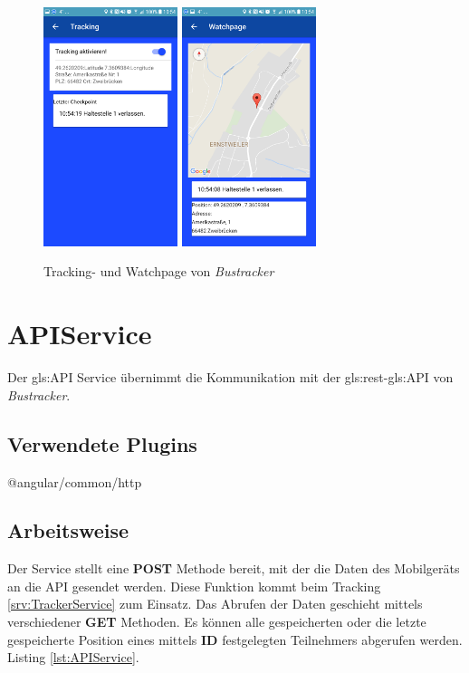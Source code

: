 \begin{figure}[htbp]
	\centering
	\includegraphics[width=0.35\textwidth]{images/Trackingpage.png}
	\includegraphics[width=0.35\textwidth]{images/Watchpage.png}
	\caption{Tracking- und Watchpage von \emph{Bustracker}}
\end{figure}

\pagebreak
\section{APIService}
\label{srv:APIService}
Der \gls{gls:API} Service übernimmt die Kommunikation mit der \gls{gls:rest}-\gls{gls:API} von \emph{Bustracker}. 
\subsection{Verwendete Plugins}
@angular/common/http \cite{AngularHttp}
\subsection{Arbeitsweise}
Der Service stellt eine \textbf{POST} Methode bereit, mit der die Daten des Mobilgeräts  an die API gesendet werden. Diese Funktion kommt beim Tracking \ref{srv:TrackerService} zum Einsatz.
Das Abrufen der Daten geschieht mittels verschiedener \textbf{GET} Methoden. Es können alle gespeicherten oder die letzte gespeicherte Position eines mittels \textbf{ID}{} festgelegten Teilnehmers abgerufen werden. Listing \ref{lst:APIService}.

